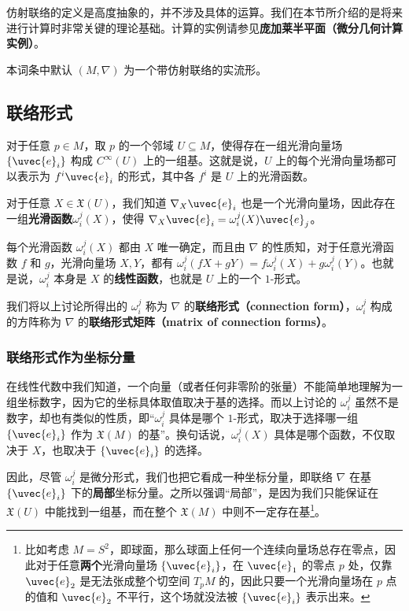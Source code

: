 

仿射联络的定义是高度抽象的，并不涉及具体的运算。我们在本节所介绍的是将来进行计算时非常关键的理论基础。计算的实例请参见\textbf{庞加莱半平面（微分几何计算实例）}。

本词条中默认 $(M, \nabla)$ 为一个带仿射联络的实流形。

\subsection{联络形式}

对于任意 $p\in M$，取 $p$ 的一个邻域 $U\subseteq M$，使得存在一组光滑向量场 $\{\uvec{e}_i\}$ 构成 $C^{\infty}(U)$ 上的一组基。这就是说，$U$ 上的每个光滑向量场都可以表示为 $f^i\uvec{e}_i$ 的形式，其中各 $f^i$ 是 $U$ 上的光滑函数。

对于任意 $X\in\mathfrak{X}(U)$，我们知道 $\nabla_X\uvec{e}_i$ 也是一个光滑向量场，因此存在一组\textbf{光滑函数}$\omega^j_i(X)$，使得 $\nabla_X\uvec{e}_i=\omega^j_i(X)\uvec{e}_j$。

每个光滑函数 $\omega^j_i(X)$ 都由 $X$ 唯一确定，而且由 $\nabla$ 的性质知，对于任意光滑函数 $f$ 和 $g$，光滑向量场 $X, Y$，都有 $\omega^j_i(fX+gY)=f\omega^j_i(X)+g\omega^j_i(Y)$。也就是说，$\omega^j_i$ 本身是 $X$ 的\textbf{线性函数}，也就是 $U$ 上的一个 $1$-形式。

我们将以上讨论所得出的 $\omega^j_i$ 称为 $\nabla$ 的\textbf{联络形式（connection form）}，$\omega^j_i$ 构成的方阵称为 $\nabla$ 的\textbf{联络形式矩阵（matrix of connection forms）}。

\subsubsection{联络形式作为坐标分量}

在线性代数中我们知道，一个向量（或者任何非零阶的张量）不能简单地理解为一组坐标数字，因为它的坐标具体取值取决于基的选择。而以上讨论的 $\omega^j_i$ 虽然不是数字，却也有类似的性质，即“$\omega^j_i$ 具体是哪个 $1$-形式，取决于选择哪一组 $\{\uvec{e}_i\}$ 作为 $\mathfrak{X}(M)$ 的基”。换句话说，$\omega^j_i(X)$ 具体是哪个函数，不仅取决于 $X$，也取决于 $\{\uvec{e}_i\}$ 的选择。

因此，尽管 $\omega_i^j$ 是微分形式，我们也把它看成一种坐标分量，即联络 $\nabla$ 在基 $\{\uvec{e}_i\}$ 下的\textbf{局部}坐标分量。之所以强调“局部”，是因为我们只能保证在 $\mathfrak{X}(U)$ 中能找到一组基，而在整个 $\mathfrak{X}(M)$ 中则不一定存在基\footnote{比如考虑 $M=S^2$，即球面，那么球面上任何一个连续向量场总存在零点，因此对于任意\textbf{两个}光滑向量场 $\{\uvec{e}_i\}$，在 $\uvec{e}_1$ 的零点 $p$ 处，仅靠 $\uvec{e}_2$ 是无法张成整个切空间 $T_pM$ 的，因此只要一个光滑向量场在 $p$ 点的值和 $\uvec{e}_2$ 不平行，这个场就没法被 $\{\uvec{e}_i\}$ 表示出来。}。

